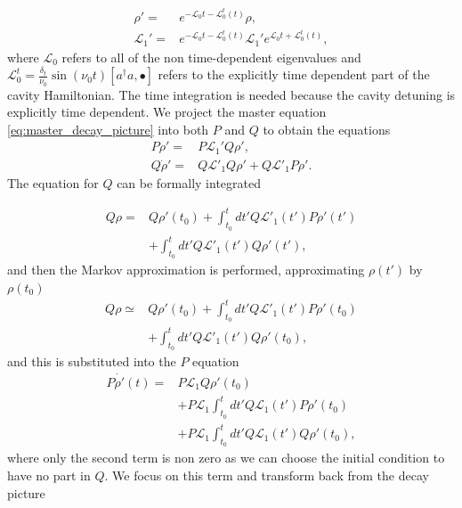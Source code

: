 \documentclass[reprint, amsmath,amssymb, aps,pra]{revtex4-1}
\begin{document}
\begin{align}
\rho' =& e^{-\mathcal{L}_0t - \mathcal{L}_0^t(t)}\rho,\\
\mathcal{L}_1' =&e^{-\mathcal{L}_0t - \mathcal{L}_0^t(t)}\mathcal{L}_1' e^{\mathcal{L}_0t +\mathcal{L}_0^t(t)},
\end{align} where $\mathcal{L}_0$ refers to all of the non time-dependent eigenvalues and $\mathcal{L}_0^t=\frac{\delta_t}{\nu_0} \sin(\nu_0t)[a^\dagger a,\bullet]$ refers to the explicitly time dependent part of the cavity Hamiltonian.  The time integration is needed because the cavity detuning is explicitly time dependent. We project the master equation \eqref{eq:master_decay_picture} into
both $P$ and $Q$ to obtain the equations 
\begin{align*}
P\dot{\rho}' =& P\mathcal{L}_1'Q\rho', \\
Q\dot{\rho}' =& Q\mathcal{L}'_1Q\rho' + Q\mathcal{L}'_1P\rho'.
\end{align*} The equation for $Q$ can be formally integrated

\begin{align*}
Q\rho =& Q\rho'(t_0) + \int_{t_0}^{t}dt' Q\mathcal{L}'_1(t')P\rho'(t')\\
       &+\int_{t_0}^{t}dt'Q\mathcal{L}'_1(t')Q\rho'(t'),
\end{align*}
 and then the Markov approximation is performed, approximating $\rho(t')$ by $\rho(t_0)$
\begin{align*}
Q\rho\simeq & Q\rho'(t_0) + \int_{t_0}^{t}dt' Q\mathcal{L}'_1(t')P\rho'(t_0)\\
       &+\int_{t_0}^{t}dt'Q\mathcal{L}'_1(t')Q\rho'(t_0),
\end{align*}
and this is substituted into the $P$ equation
\begin{align}
P\dot{\rho'}(t) =& P\mathcal{L}_1Q\rho'(t_0)\\ 
 &+ P\mathcal{L}_1\int_{t_0}^{t}dt' Q\mathcal{L}_1(t')P\rho'(t_0)\nonumber \\
 &+ P\mathcal{L}_1\int_{t_0}^{t}dt'Q\mathcal{L}_1(t')Q\rho'(t_0)\nonumber,
\end{align}
where only the second term is non zero as we can choose the initial condition to have no part in $Q$. We focus on this term and transform back from the decay
picture
\end{document}
